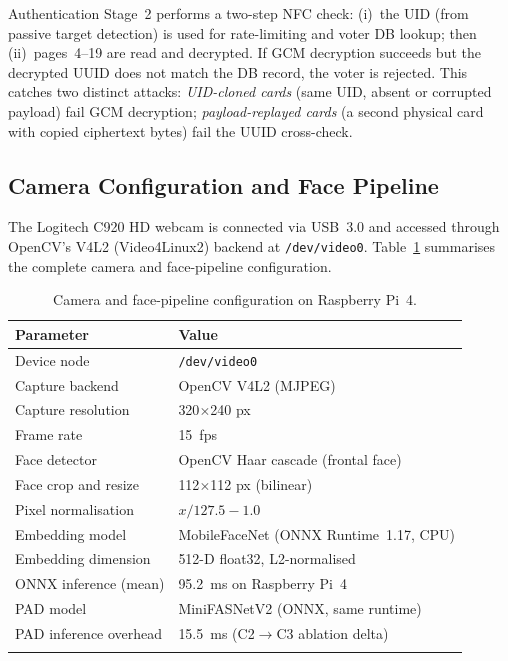 \documentclass[pdflatex,sn-mathphys-num]{sn-jnl}%
\theoremstyle{thmstyleone}%
\theoremstyle{thmstyletwo}%
\theoremstyle{thmstylethree}%
\begin{document}
Authentication Stage~2 performs a two-step NFC check: (i)~the UID (from
passive target detection) is used for rate-limiting and voter DB lookup; then
(ii)~pages~4--19 are read and decrypted. If GCM decryption succeeds but the
decrypted UUID does not match the DB record, the voter is rejected. This
catches two distinct attacks: \emph{UID-cloned cards} (same UID, absent or
corrupted payload) fail GCM decryption; \emph{payload-replayed cards} (a
second physical card with copied ciphertext bytes) fail the UUID cross-check.

\subsection{Camera Configuration and Face Pipeline}

The Logitech C920 HD webcam is connected via USB~3.0 and accessed through
OpenCV's V4L2 (Video4Linux2) backend at \texttt{/dev/video0}.
Table~\ref{tab:camera_config} summarises the complete camera and
face-pipeline configuration.

\begin{table}[t]
\caption{Camera and face-pipeline configuration on Raspberry Pi~4.}
\label{tab:camera_config}%
\begin{tabular}{@{}ll@{}}
  \toprule
  Parameter & Value \\
  \midrule
  Device node             & \texttt{/dev/video0} \\
  Capture backend         & OpenCV V4L2 (MJPEG) \\
  Capture resolution      & 320$\times$240 px \\
  Frame rate              & 15~fps \\
  Face detector           & OpenCV Haar cascade (frontal face) \\
  Face crop and resize    & 112$\times$112 px (bilinear) \\
  Pixel normalisation     & $x/127.5 - 1.0$ \\
  Embedding model         & MobileFaceNet (ONNX Runtime~1.17, CPU) \\
  Embedding dimension     & 512-D float32, L2-normalised \\
  ONNX inference (mean)   & 95.2~ms on Raspberry Pi~4 \\
  PAD model               & MiniFASNetV2 (ONNX, same runtime) \\
  PAD inference overhead  & 15.5~ms (C2$\to$C3 ablation delta) \\
  \botrule
\end{tabular}
\end{table}
\end{document}
